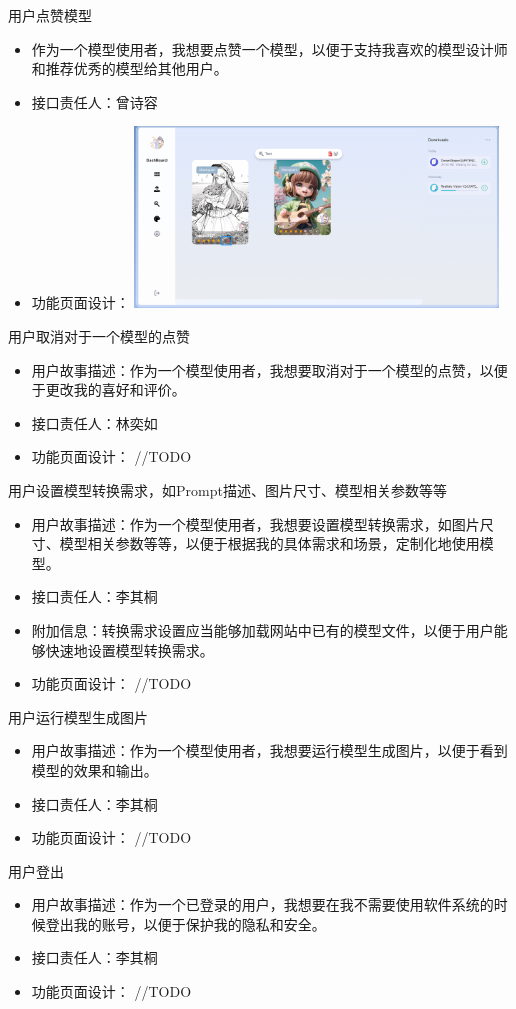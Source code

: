 \begin{frame}{用户点赞模型}
    \begin{itemize}
        \item 作为一个模型使用者，我想要点赞一个模型，以便于支持我喜欢的模型设计师和推荐优秀的模型给其他用户。
        \item 接口责任人：曾诗容
        \item 功能页面设计： %
        \includegraphics[width=3.8in]{contents/figure/like_model_demo.png}
    \end{itemize}
\end{frame}

\begin{frame}{用户取消对于一个模型的点赞}
    \begin{itemize}
        \item 用户故事描述：作为一个模型使用者，我想要取消对于一个模型的点赞，以便于更改我的喜好和评价。
        \item 接口责任人：林奕如
        \item 功能页面设计： //TODO
    \end{itemize}
\end{frame}

\begin{frame}{用户设置模型转换需求，如Prompt描述、图片尺寸、模型相关参数等等}
    \begin{itemize}
        \item 用户故事描述：作为一个模型使用者，我想要设置模型转换需求，如图片尺寸、模型相关参数等等，以便于根据我的具体需求和场景，定制化地使用模型。
        \item 接口责任人：李其桐
        \item 附加信息：转换需求设置应当能够加载网站中已有的模型文件，以便于用户能够快速地设置模型转换需求。
        \item 功能页面设计： //TODO
    \end{itemize}
\end{frame}

\begin{frame}{用户运行模型生成图片}
    \begin{itemize}
        \item 用户故事描述：作为一个模型使用者，我想要运行模型生成图片，以便于看到模型的效果和输出。
        \item 接口责任人：李其桐
        \item 功能页面设计： //TODO
    \end{itemize}
\end{frame}

\begin{frame}{用户登出}
    \begin{itemize}
        \item 用户故事描述：作为一个已登录的用户，我想要在我不需要使用软件系统的时候登出我的账号，以便于保护我的隐私和安全。
        \item 接口责任人：李其桐
        \item 功能页面设计： //TODO
    \end{itemize}
\end{frame}